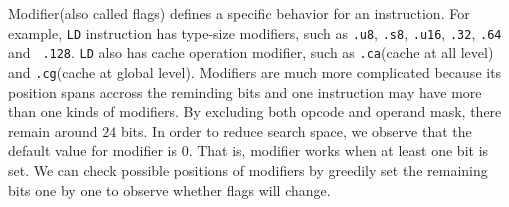 Modifier(also called flags) defines a specific behavior for an instruction. For example,
{\tt LD} instruction has type-size modifiers, such as {\tt .u8}, {\tt .s8}, {\tt .u16}, {\tt .32}, {\tt .64} and {\tt 
.128}. {\tt LD} also has cache operation modifier, such as {\tt .ca}(cache at all level) and {\tt .cg}(cache at global 
level). Modifiers are much more complicated because its position spans accross the reminding bits and one instruction 
may have more than one kinds of modifiers. By excluding both opcode and operand mask, there remain around $24$ bits. In 
order to reduce search space, we observe that the default value for modifier is $0$. That is, modifier works when at 
least one bit is set. We can check possible positions of modifiers by greedily set the remaining bits one by one to 
observe whether flags will change.
